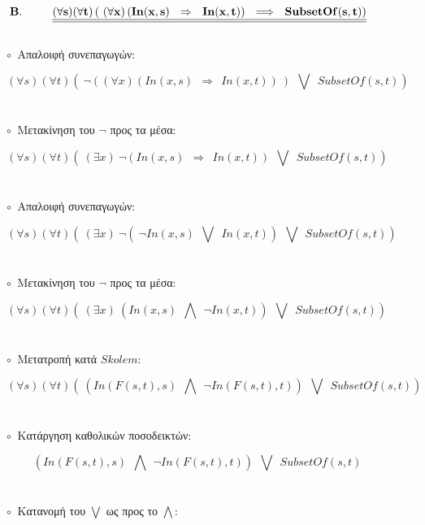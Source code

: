 \documentclass[10pt]{article}
\begin{document}
\[ \bf B. \ \ \ \ \ \ \ \ \underline{\underline{
(\forall s)(\forall t)\left( \ (\forall x) \left( In(x,s) \ \ \Rightarrow \ \ In(x,t) \right ) \ \ \Longrightarrow  \ \ SubsetOf(s,t) \right)}}
 \ \ \ \ \ \ \ \ \ \ \ \ \] \\
 
$\circ \ $ Απαλοιφή συνεπαγωγών:

\[ 
(\forall s)(\forall t)\left( \ \neg \left( (\forall x) \left( In(x,s) \ \ \Rightarrow \ \ In(x,t) \right ) \ \right) \ \ \bigvee  \ \ SubsetOf(s,t) \right)
 \ \ \ \ \ \ \ \ \ \ \ \ \] \\ \\
 
$\circ \ $ Μετακίνηση του $\neg$ προς τα μέσα:

\[ 
(\forall s)(\forall t)\left( \  (\exists x) \ \neg \left( In(x,s) \ \ \Rightarrow \ \ In(x,t) \right ) \ \ \bigvee  \ \ SubsetOf(s,t) \right)
 \ \ \ \ \ \ \ \ \ \ \ \ \] \\ \\
 
$\circ \ $ Απαλοιφή συνεπαγωγών:

\[ 
(\forall s)(\forall t)\left( \  (\exists x) \ \neg \left( \ \neg In(x,s) \ \ \bigvee \ \ In(x,t) \right ) \ \ \bigvee  \ \ SubsetOf(s,t) \right)
 \ \ \ \ \ \ \ \ \ \ \ \ \] \\ \\
  
$\circ \ $ Μετακίνηση του $\neg$ προς τα μέσα:

\[ 
(\forall s)(\forall t)\left( \  (\exists x) \ \left(  In(x,s) \ \ \bigwedge \ \ \neg In(x,t) \right ) \ \ \bigvee  \ \ SubsetOf(s,t) \right)
 \ \ \ \ \ \ \ \ \ \ \ \ \] \\ \\
  
$\circ \ $ Μετατροπή κατά $Skolem$:

\[ 
(\forall s)(\forall t)\left( \  \left(  In(F(s,t),s) \ \ \bigwedge \ \ \neg In(F(s,t),t) \right ) \ \ \bigvee  \ \ SubsetOf(s,t) \right)
 \ \ \ \ \ \ \ \ \ \ \ \ \] \\ \\

 $\circ \ $ Κατάργηση καθολικών ποσοδεικτών:

\[ 
 \  \left(  In(F(s,t),s) \ \ \bigwedge \ \ \neg In(F(s,t),t) \right ) \ \ \bigvee  \ \ SubsetOf(s,t) 
 \ \ \ \ \ \ \ \ \ \ \ \ \] \\ \\

 $\circ \ $ Κατανομή του $\bigvee$ ως προς το $\bigwedge$:
\end{document}
